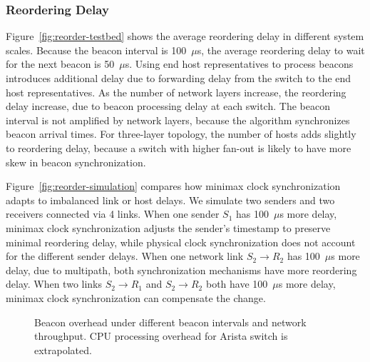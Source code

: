 \subsubsection{Reordering Delay}
\label{sec:eval-delay}

Figure~\ref{fig:reorder-testbed} shows the average reordering delay in different system scales. Because the beacon interval is 100~$\mu$s, the average reordering delay to wait for the next beacon is 50~$\mu$s. Using end host representatives to process beacons introduces additional delay due to forwarding delay from the switch to the end host representatives. As the number of network layers increase, the reordering delay increase, due to beacon processing delay at each switch. The beacon interval is not amplified by network layers, because the algorithm synchronizes beacon arrival times. For three-layer topology, the number of hosts adds slightly to reordering delay, because a switch with higher fan-out is likely to have more skew in beacon synchronization.

Figure~\ref{fig:reorder-simulation} compares how minimax clock synchronization adapts to imbalanced link or host delays. We simulate two senders and two receivers connected via 4 links. When one sender $S_1$ has 100~$\mu$s more delay, minimax clock synchronization adjusts the sender's timestamp to preserve minimal reordering delay, while physical clock synchronization does not account for the different sender delays. When one network link $S_2 \rightarrow R_2$ has 100~$\mu$s more delay, due to multipath, both synchronization mechanisms have more reordering delay. When two links $S_2 \rightarrow R_1$ and $S_2 \rightarrow R_2$ both have 100~$\mu$s more delay, minimax clock synchronization can compensate the change.



\begin{figure}[t]
\centering
	\hspace{0.01\textwidth}
\caption{Beacon overhead under different beacon intervals and network throughput. CPU processing overhead for Arista switch is extrapolated.}
\label{fig:overhead}
\end{figure}


